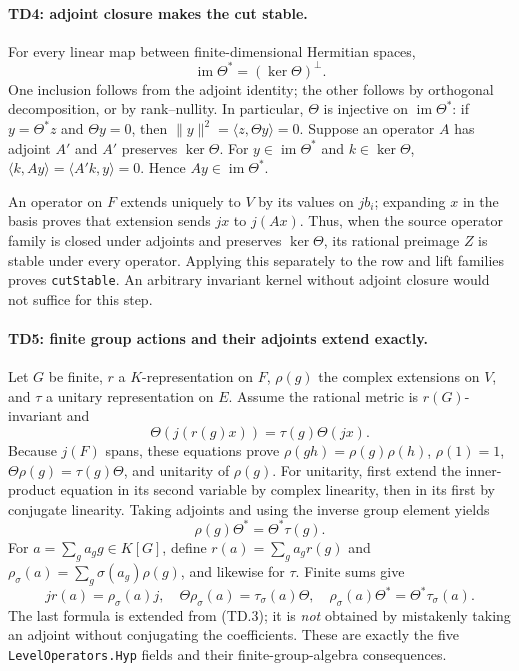 \paragraph{TD4: adjoint closure makes the cut stable.}
For every linear map between finite-dimensional Hermitian spaces,
\[
 \operatorname{im}\Theta^*=(\ker\Theta)^\perp.
 \tag{TD.2}
\]
One inclusion follows from the adjoint identity; the other follows by
orthogonal decomposition, or by rank--nullity. In particular,
$\Theta$ is injective on $\operatorname{im}\Theta^*$: if
$y=\Theta^*z$ and $\Theta y=0$, then
$\|y\|^2=\langle z,\Theta y\rangle=0$.
Suppose an operator $A$ has adjoint $A'$ and $A'$ preserves
$\ker\Theta$. For $y\in\operatorname{im}\Theta^*$ and
$k\in\ker\Theta$,
$\langle k,Ay\rangle=\langle A'k,y\rangle=0$.
Hence $Ay\in\operatorname{im}\Theta^*$.

An operator on $F$ extends uniquely to $V$ by its values on $jb_i$;
expanding $x$ in the basis proves that extension sends $jx$ to $j(Ax)$.
Thus, when the source operator family is closed under adjoints and
preserves $\ker\Theta$, its rational preimage $Z$ is stable under every
operator. Applying this separately to the row and lift families proves
\texttt{cutStable}. An arbitrary invariant kernel without adjoint
closure would not suffice for this step.

\paragraph{TD5: finite group actions and their adjoints extend exactly.}
Let $G$ be finite, $r$ a $K$-representation on $F$, $\rho(g)$ the
complex extensions on $V$, and $\tau$ a unitary representation on $E$.
Assume the rational metric is $r(G)$-invariant and
\[
 \Theta(j(r(g)x))=\tau(g)\Theta(jx).
\]
Because $j(F)$ spans, these equations prove
$\rho(gh)=\rho(g)\rho(h)$, $\rho(1)=1$,
$\Theta\rho(g)=\tau(g)\Theta$, and unitarity of $\rho(g)$.
For unitarity, first extend the inner-product equation in its second
variable by complex linearity, then in its first by conjugate linearity.
Taking adjoints and using the inverse group element yields
\[
 \rho(g)\Theta^*=\Theta^*\tau(g).
 \tag{TD.3}
\]
For $a=\sum_g a_g g\in K[G]$, define
$r(a)=\sum_g a_g r(g)$ and
$\rho_\sigma(a)=\sum_g\sigma(a_g)\rho(g)$, and likewise for $\tau$.
Finite sums give
\[
 j r(a)=\rho_\sigma(a)j,\quad
 \Theta\rho_\sigma(a)=\tau_\sigma(a)\Theta,\quad
 \rho_\sigma(a)\Theta^*=\Theta^*\tau_\sigma(a).
 \tag{TD.4}
\]
The last formula is extended from (TD.3); it is \emph{not} obtained by
mistakenly taking an adjoint without conjugating the coefficients.
These are exactly the five \texttt{LevelOperators.Hyp} fields and their
finite-group-algebra consequences.

